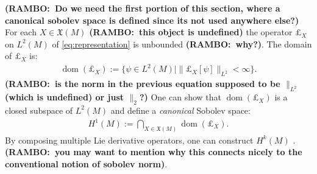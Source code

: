\documentclass[final,leqno]{siamltex1213}
\newcommand{\ram}[1]{{\normalsize{\textbf{({\color{red}RAMBO:\ }#1)}}}}
\begin{document}
\ram{Do we need the first portion of this section, where a canonical sobolev space is defined since its not used anywhere else?}
For each $X \in \mathfrak{X}(M)$ \ram{this object is undefined} the operator $\pounds_{X}$ on $L^{2}(M)$ of \eqref{eq:representation} is unbounded \ram{why?}.
The domain of $\pounds_{X}$ is:
\begin{align}
	\operatorname{dom}( \pounds_{X} ) := \{ \psi \in L^{2}(M) \mid  \| \pounds_{X}[\psi] \|_{L^{2}} < \infty \}.
\end{align}
\ram{is the norm in the previous equation supposed to be $\|_{L^2}$ (which is undefined) or just $\|_2$?} One can show that $\operatorname{dom}( \pounds_{X} )$ is a closed subspace of $L^{2}(M)$ and define
a \emph{canonical} Sobolev space:
\begin{align}
	H^{1}(M) := \bigcap_{X \in \mathfrak{X}(M)} \operatorname{dom}( \pounds_{X} ).
\end{align}
By composing multiple Lie derivative operators, one can construct $H^{k}(M)$ . \ram{you may want to mention why this connects nicely to the conventional notion of sobolev norm}.
\end{document}

